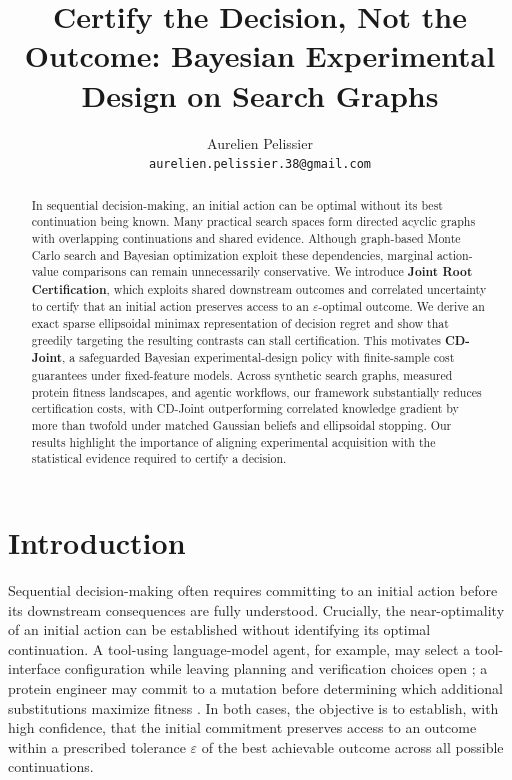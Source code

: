 \documentclass{article}
\title{Certify the Decision, Not the Outcome: Bayesian Experimental Design on Search Graphs}
\author{Aurelien Pelissier\\
\texttt{aurelien.pelissier.38@gmail.com}}
\theoremstyle{plain}
\theoremstyle{definition}
\begin{document}
\maketitle

\begin{abstract}
In sequential decision-making, an initial action can be optimal
without its best continuation being known. Many practical search
spaces form directed acyclic graphs with overlapping continuations
and shared evidence. Although graph-based Monte Carlo search and
Bayesian optimization exploit these dependencies, marginal
action-value comparisons can remain unnecessarily conservative.
We introduce \textbf{Joint Root Certification}, which exploits
shared downstream outcomes and correlated uncertainty to certify
that an initial action preserves access to an $\varepsilon$-optimal
outcome. We derive an exact sparse ellipsoidal minimax representation
of decision regret and show that greedily targeting the resulting
contrasts can stall certification. This motivates \textbf{CD-Joint},
a safeguarded Bayesian experimental-design policy with finite-sample
cost guarantees under fixed-feature models. Across synthetic search
graphs, measured protein fitness landscapes, and agentic workflows,
our framework substantially reduces certification costs, with
CD-Joint outperforming correlated knowledge gradient by more than
twofold under matched Gaussian beliefs and ellipsoidal stopping.
Our results highlight the importance of aligning experimental
acquisition with the statistical evidence required to certify
a decision.
\end{abstract}

\section{Introduction}
\label{sec:intro}

Sequential decision-making often requires committing to an initial
action before its downstream consequences are fully understood.
Crucially, the near-optimality of an initial action can be
established without identifying its optimal continuation.
A tool-using language-model agent, for example, may select a
tool-interface configuration while leaving planning and verification
choices open \citep{zhang2025aflow}; a protein engineer may commit
to a mutation before determining which additional substitutions
maximize fitness \citep{wu2016gb1,johnston2024trpb}.
In both cases, the objective is to establish, with high confidence,
that the initial commitment preserves access to an outcome within
a prescribed tolerance $\varepsilon$ of the best achievable outcome
across all possible continuations.
\end{document}
